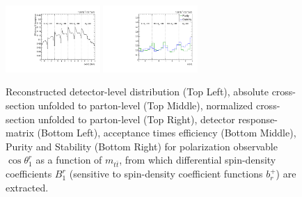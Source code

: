 \begin{figure}[htb]
\begin{center}
 \includegraphics[width=0.32\textwidth]{fig_fullRun2UL/unfolding/combined/TotEff_b1r_mttbar.pdf}
 \includegraphics[width=0.32\textwidth]{fig_fullRun2UL/unfolding/combined/PurStab_b1r_mttbar.pdf} \\
\caption{Reconstructed detector-level distribution (Top Left), absolute cross-section unfolded to parton-level (Top Middle), normalized cross-section unfolded to parton-level (Top Right), detector response-matrix (Bottom Left), acceptance times efficiency (Bottom Middle), Purity and Stability (Bottom Right) for polarization observable $\cos\theta_{1}^{r}$ as a function of $m_{t\bar{t}}$, from which differential spin-density coefficients $B_{1}^{r}$ (sensitive to spin-density coefficient functions $b_r^{+}$) are extracted.}
\label{fig:b1r_mttbar}
\end{center}
\end{figure}
\clearpage
